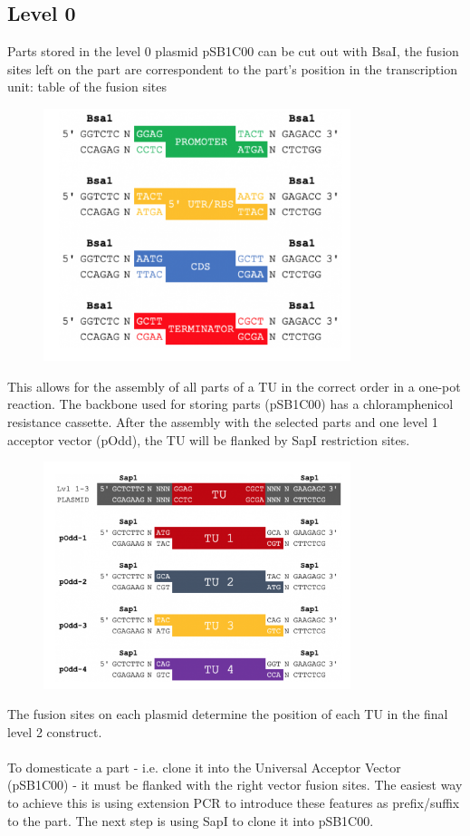 \subsection*{Level 0}

Parts stored in the level 0 plasmid pSB1C00 can be cut out with BsaI, the fusion sites left on the part are correspondent to the part’s position in the transcription unit:
table of the fusion sites
\begin{figure}[!htbp]
    \centering
    \includegraphics[width=0.8\textwidth]{images/chap4/chap4_typ_01.png}
    \label{fig:ch4typ01}
\end{figure}
\FloatBarrier
\noindent
This allows for the assembly of all parts of a TU in the correct order in a one-pot reaction. 
The backbone used for storing parts (pSB1C00) has a chloramphenicol resistance cassette. After the assembly with the selected parts and one level 1 acceptor vector (pOdd), the TU will be flanked by SapI restriction sites.
\begin{figure}[!htbp]
    \centering
    \includegraphics[width=0.8\textwidth]{images/chap4/chap4_typ_02.png}
    \label{fig:ch4typ02}
\end{figure}
\FloatBarrier
\noindent
The fusion sites on each plasmid determine the position of each TU in the final level 2 construct.\\ \\
To domesticate a part - i.e. clone it into the Universal Acceptor Vector (pSB1C00) - it must be flanked with the right vector fusion sites. The easiest way to achieve this is using extension PCR to introduce these features as prefix/suffix to the part. The next step is using SapI to clone it into pSB1C00.

